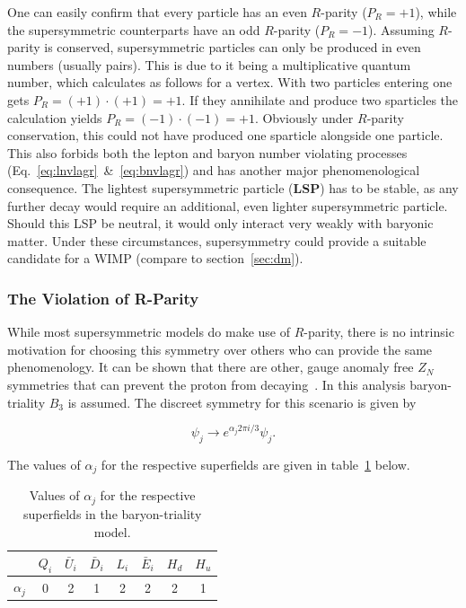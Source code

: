 \noindent One can easily confirm that every particle has an even $R$-parity ($P_R = +1$), while the supersymmetric counterparts have an odd $R$-parity ($P_R = -1$). Assuming $R$-parity is conserved, supersymmetric particles can only be produced in even numbers (usually pairs). This is due to it being a multiplicative quantum number, which calculates as follows for a vertex. With two particles entering one gets $P_R = (+1) \cdot (+1) = +1$. If they annihilate and produce two sparticles the calculation yields $P_R = (-1) \cdot (-1) = +1$. Obviously under $R$-parity conservation, this could not have produced one sparticle alongside one particle. This also forbids both the lepton and baryon number violating processes (Eq.~\ref{eq:lnvlagr}~\&~\ref{eq:bnvlagr}) and has another major phenomenological consequence. The lightest supersymmetric particle (\textbf{LSP}) has to be stable, as any further decay would require an additional, even lighter supersymmetric particle. Should this LSP be neutral, it would only interact very weakly with baryonic matter. Under these circumstances, supersymmetry could provide a suitable candidate for a WIMP (compare to section~\ref{sec:dm}).



\subsubsection{The Violation of R-Parity}
\label{sec:rparityvio}

While most supersymmetric models do make use of $R$-parity, there is no intrinsic motivation for choosing this symmetry over others who can provide the same phenomenology. It can be shown that there are other, gauge anomaly free $Z_N$ symmetries that can prevent the proton from decaying~\cite{b3p6}. In this analysis baryon-triality $B_3$ is assumed. The discreet symmetry for this scenario is given by~\cite{b3def}

\begin{equation}
  \label{eq:b3symmetry}
  \psi_j \rightarrow e^{\alpha_j 2\pi i/3} \psi_j.
\end{equation}

\noindent The values of $\alpha_j$ for the respective superfields are given in table~\ref{tab:alphaj} below.

\begin{table}[htb]
  \centering
  \begin{tabular}{|c|c|c|c|c|c|c|c|}
    \hline
    & $Q_i$ & $\bar{U}_i$ & $\bar{D}_i$ & $L_i$ & $\bar{E}_i$ & $H_d$ & $H_u$ \\ \hline
    $\alpha_j$ & 0 & 2 & 1 & 2 & 2 & 2 & 1 \\ \hline
  \end{tabular}
  \caption{Values of $\alpha_j$ for the respective superfields in the baryon-triality model.}
  \label{tab:alphaj}
\end{table}

